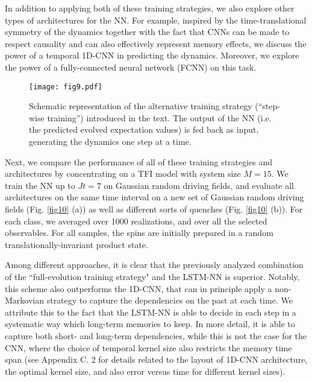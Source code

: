 \documentclass[a4paper,aps,amsmath,amssymb,twocolumn,longbibliography,,accepted=2022-05-17]{quantumarticle}
\begin{document}
In addition to applying both of these training strategies, we also explore other types of architectures for the NN. For example, inspired by the time-translational symmetry of the dynamics together with the fact that CNNs can be made to respect causality and can also effectively represent memory effects, we discuss the power of a temporal 1D-CNN in predicting the dynamics. Moreover, we explore the power of a fully-connected neural network (FCNN) on this task. 

\begin{figure}[]
	\centering
	\texttt{[image: fig9.pdf]}
	\caption{
		Schematic representation of the alternative training strategy (``step-wise training'') introduced in the text. The output of the NN (i.e. the predicted evolved expectation values) is fed back as input, generating the dynamics one step at a time.
	}
	\label{fig9}
\end{figure}



Next, we compare the performance of all of these training strategies and architectures by concentrating on a TFI model with system size $M=15$. We train the NN up to $Jt=7$ on  Gaussian random driving fields, and evaluate all architectures on the same time interval on a new set of  Gaussian random driving fields (Fig. \ref{fig10} (a)) as well as different sorts of quenches (Fig. \ref{fig10} (b)). For each class, we averaged over 1000 realizations, and over all the selected observables.
For all samples, the spins are initially prepared in a random translationally-invariant product state.

Among different approaches, it is clear that the previously analyzed combination of the ``full-evolution training strategy" and the LSTM-NN is superior. Notably, this scheme also outperforms the 1D-CNN, that can in principle apply a non-Markovian strategy to capture the dependencies on the past at each time. We attribute this to the fact that the LSTM-NN is able to decide in each step in a systematic way which long-term memories to keep. In more detail, it is able to capture both short- and long-term dependencies, while this is not the case for the CNN, where the choice of temporal kernel size also restricts the memory time span (see Appendix C. 2 for details related to the layout of 1D-CNN architecture, the optimal kernel size, and also  error  versus time for different kernel sizes).
\end{document}
